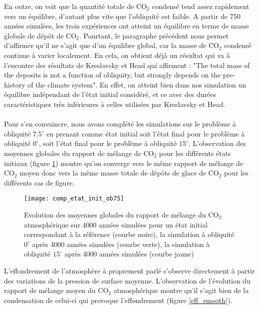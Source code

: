 \documentclass[11pt,a4paper]{article}
\begin{document}
En outre, on voit que la quantité totale de CO$_2$ condensé tend assez rapidement vers un équilibre, d'autant plus vite que l'obliquité est faible. A partir de 750 années simulées, les trois expériences ont atteint un équilibre en terme de masse globale de dépôt de CO$_2$. Pourtant, le paragraphe précédent nous permet d'affirmer qu'il ne s'agit que d'un équilibre global, car la masse de CO$_2$ condensé continue à varier localement. En cela, on obtient déjà un résultat qui va à l'encontre des résultats de Kreslavsky et Head \citep{Kres:05} qui affirment : "The total mass of the deposits is not a function of obliquity, but strongly depends on the pre-history of the climate system". En effet, on atteint bien dans nos simulation un équilibre indépendant de l'état initial considéré, et ce avec des durées caractéristiques très inférieures à celles utilisées par Kreslavsky et Head. \\ \\
Pour s'en convaincre, nous avons complété les simulations sur le problème à obliquité $7.5^\circ$ en prenant comme état initial soit l'état final pour le problème à obliquité $0^\circ$, soit l'état final pour le problème à obliquité $15^\circ$. L'observation des moyennes globales du rapport de mélange de CO$_2$ pour les différents états initiaux (figure \ref{comp_etat_init_ob75}) montre qu'on converge vers le même rapport de mélange de CO$_2$ moyen donc vers la même masse totale de dépôts de glace de CO$_2$ pour les différents cas de figure. \\
\begin{figure}[h!]
\begin{center}
\texttt{[image: comp\_etat\_init\_ob75]}
\caption{Evolution des moyennes globales du rapport de mélange du CO$_2$ atmosphérique sur 4000 années simulées pour un état initial correspondant à la référence (courbe noire), la simulation à obliquité $0^\circ$ après 4000 années simulées (courbe verte), la simulation à obliquité $15^\circ$ après 4000 années simulées (courbe jaune)}
\label{comp_etat_init_ob75}
\end{center}
\end{figure}

L'effondrement de l'atmosphère à proprement parlé s'observe directement à partir des variations de la pression de surface moyenne. L'observation de l'évolution du rapport de mélange moyen du CO$_2$ atmosphérique montre qu'il s'agit bien de la condensation de celui-ci qui provoque l'effondrement (figure \ref{eff_smooth}). \\
\end{document}
